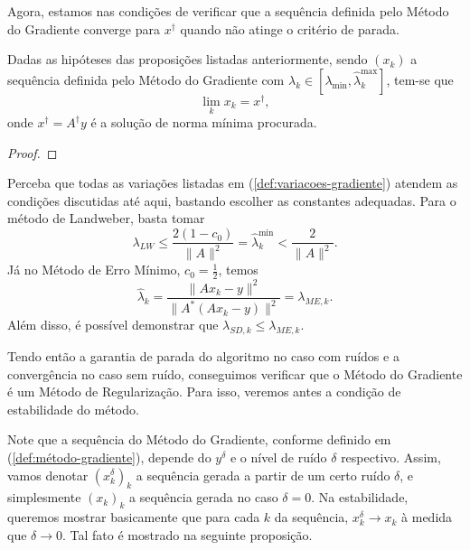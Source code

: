 Agora, estamos nas condições de verificar que a sequência definida pelo Método do Gradiente converge para $x^\dag$ quando não atinge o critério de parada.

\begin{prop}
    Dadas as hipóteses das proposições listadas anteriormente, sendo $(x_k)$ a sequência definida pelo Método do Gradiente com $\lambda_k\in[\lambda_{\min}, \hat\lambda_k^{\max}]$, tem-se que
    \[
        \lim_k x_k = x^\dag,
    \]
    onde $x^\dag = A^\dag y$ é a solução de norma mínima procurada.
\end{prop}
\begin{proof}
\end{proof}
\begin{obs}
    Perceba que todas as variações listadas em (\ref{def:variacoes-gradiente}) atendem as condições discutidas até aqui, bastando escolher as constantes adequadas. Para o método de Landweber, basta tomar
    \[
        \lambda_{LW} \leq \frac{2(1-c_0)}{\|A\|^2} = \hat \lambda_k^{\min} < \frac{2}{\|A\|^2}.
    \]
    Já no Método de Erro Mínimo, $c_0=\frac 1 2$, temos
    \[
        \hat \lambda_k = \frac{\|Ax_k-y\|^2}{\|A^*(Ax_k-y)\|^2} = \lambda_{ME,k}.
    \]
    Além disso, é possível demonstrar que $\lambda_{SD,k}\leq\lambda_{ME,k}$.
\end{obs}

Tendo então a garantia de parada do algoritmo no caso com ruídos e a convergência no caso sem ruído, conseguimos verificar que o Método do Gradiente é um Método de Regularização. Para isso, veremos antes a condição de estabilidade do método. 

Note que a sequência do Método do Gradiente, conforme definido em (\ref{def:método-gradiente}), depende do $y^\delta$ e o nível de ruído $\delta$ respectivo. Assim, vamos denotar $(x_k^\delta)_k$ a sequência gerada a partir de um certo ruído $\delta$, e simplesmente $(x_k)_k$ a sequência gerada no caso $\delta=0$. Na estabilidade, queremos mostrar basicamente que para cada $k$ da sequência, $x_k^\delta \to x_k$ à medida que $\delta \to 0$. Tal fato é mostrado na seguinte proposição.

